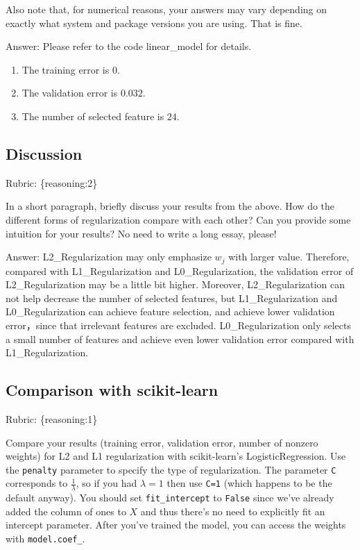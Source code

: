 \documentclass{article}
\def\rubric#1{\gre{Rubric: \{#1\}}}{}
\def\gre#1{{\color{gre}#1}}
\begin{document}
Also note that, for numerical reasons, your answers may vary depending on exactly what system and package versions you are using. That is fine.

\gre{Answer:
Please refer to the code linear\_model for details.
\begin{enumerate}
    \item The training error is $0$.
    \item The validation error is $0.032$.
    \item The number of selected feature is $24$.
\end{enumerate}
}

\subsection{Discussion}
\rubric{reasoning:2}

In a short paragraph, briefly discuss your results from the above. How do the
different forms of regularization compare with each other?
Can you provide some intuition for your results? No need to write a long essay, please!

\gre{Answer:
L2\_Regularization may only emphasize $w_j$ with larger value. Therefore, compared with L1\_Regularization and L0\_Regularization, the validation error of L2\_Regularization may be a little bit higher.
Moreover, L2\_Regularization can not help decrease the number of selected features, but L1\_Regularization and L0\_Regularization can achieve feature selection, and achieve lower validation error，since that irrelevant features are excluded. L0\_Regularization only selects a small number of features and achieve even lower validation error compared with L1\_Regularization.
}

\subsection{Comparison with scikit-learn}
\rubric{reasoning:1}

Compare your results (training error, validation error, number of nonzero weights) for L2 and L1 regularization with scikit-learn's LogisticRegression. Use the
\texttt{penalty} parameter to specify the type of regularization. The parameter \texttt{C} corresponds to $\frac{1}{\lambda}$, so if
you had $\lambda=1$ then use \texttt{C=1} (which happens to be the default anyway).
You should set \texttt{fit\string_intercept} to \texttt{False} since we've already added the column of ones to $X$ and thus
there's no need to explicitly fit an intercept parameter. After you've trained the model, you can access the weights
with \texttt{model.coef\string_}.
\end{document}
